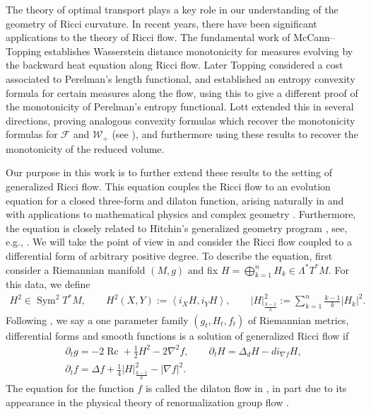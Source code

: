 \documentclass[pdftex]{sigma}
\numberwithin{equation}{section}
\newcommand{\del}{\partial}
\newcommand{\N}{\nabla}
\newcommand{\FF}{\mathcal F}
\newcommand{\WW}{\mathcal W}
\newcommand{\IP}[1]{\left<#1\right>}
\newcommand{\wwnorm}[1]{\left|#1\right|^2_{\frac{k-1}k}}
\DeclareMathOperator{\Sym}{Sym}
\DeclareMathOperator{\Rc}{Rc}
\begin{document}
The theory of optimal transport plays a key role in our understanding of the geometry of Ricci curvature. In recent years, there have been significant applications to the theory of Ricci flow. The fundamental work of McCann--Topping \cite{McCannTopping} establishes Wasserstein distance monotonicity for measures evolving by the backward heat equation along Ricci flow. Later Topping \cite{ToppingOT} considered a cost associated to Perelman's length functional, and established an entropy convexity formula for certain measures along the flow, using this to give a different proof of the monotonicity of Perelman's entropy functional. Lott \cite{LottOTPRV} extended this in several directions, proving analogous convexity formulas which recover the monotonicity formulas for $\FF$ and $\WW_+$ (see \cite{FIN, Perelman1}), and furthermore using these results to recover the monotonicity of the reduced volume.

Our purpose in this work is to further extend these results to the setting of generalized Ricci flow. This equation couples the Ricci flow to an evolution equation for a closed three-form and dilaton function, arising naturally in and with applications to mathematical physics \cite{HeLiuGRF,OSW,Polchinski,StreetsTdual} and complex geometry \cite{JFS, StreetsPCFBI, PCF}. Furthermore, the equation is closely related to Hitchin's generalized geometry program \cite{AXu,GualtieriGKG,HitchinGCY}, see, e.g., \cite{MGFRicciflowTdual, GRFbook, GKRF}. We will take the point of view in \cite{Streetsscalar} and consider the Ricci flow coupled to a differential form of arbitrary positive degree. To describe the equation, first consider a Riemannian manifold $(M, g)$ and fix $H=\bigoplus_{k=1}^n H_k\in\Lambda^*T^*M$. For this data, we define
\begin{align*}
 H^2 \in \Sym^2 T^*M,\qquad H^2(X,Y) := \IP{i_X H, i_Y H}, \qquad \wwnorm{H}:= \sum_{k=1}^n\frac{k-1}k|H_k|^2.
\end{align*}
Following \cite{Streetsscalar}, we say a one parameter family $(g_t, H_t, f_t)$ of Riemannian metrics, differential forms and smooth functions is a solution of generalized Ricci flow if
\begin{gather*}
\del_tg= -2 \Rc + \frac12 H^2- 2 \N^2 f,\qquad
\del_t H= \Delta_dH-d i_{\N f}H,\\
\del_t f= \Delta f+\frac14 \wwnorm{H}-|\N f|^2.
\end{gather*}
The equation for the function $f$ is called the dilaton flow in \cite{Streetsscalar}, in part due to its appearance in the physical theory of renormalization group flow \cite{Polchinski}.
\end{document}
